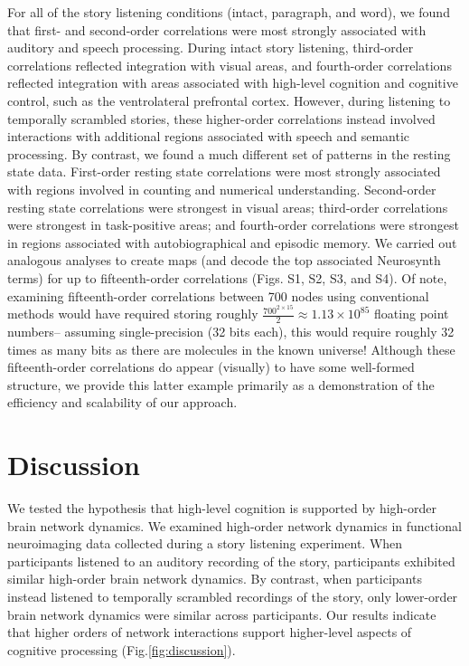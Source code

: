 \documentclass[english]{article}
\begin{document}
For all of the story listening conditions (intact, paragraph, and
word), we found that first- and second-order correlations were most
strongly associated with auditory and speech processing.  During
intact story listening, third-order correlations reflected integration
with visual areas, and fourth-order correlations reflected integration
with areas associated with high-level cognition and cognitive control,
such as the ventrolateral prefrontal cortex.  However, during
listening to temporally scrambled stories, these higher-order
correlations instead involved interactions with additional regions
associated with speech and semantic processing.  By contrast, we found
a much different set of patterns in the resting state data.
First-order resting state correlations were most strongly associated
with regions involved in counting and numerical understanding.
Second-order resting state correlations were strongest in visual
areas; third-order correlations were strongest in task-positive areas;
and fourth-order correlations were strongest in regions associated
with autobiographical and episodic memory.  We carried out analogous
analyses to create maps (and decode the top associated Neurosynth
terms) for up to fifteenth-order correlations (Figs. S1, S2, S3, and
S4).  Of note, examining fifteenth-order correlations between 700
nodes using conventional methods would have required storing roughly
$\frac{700^{2 \times 15}}{2} \approx 1.13 \times 10^{85}$ floating point
numbers-- assuming single-precision (32 bits each), this would require
roughly 32 times as many bits as there are molecules in the known
universe!  Although these fifteenth-order correlations do appear
(visually) to have some well-formed structure, we provide this latter
example primarily as a demonstration of the efficiency and scalability
of our approach.






\section*{Discussion}
We tested the hypothesis that high-level cognition is supported by
high-order brain network dynamics.  We examined high-order network
dynamics in functional neuroimaging data collected during a story
listening experiment.  When participants listened to an auditory
recording of the story, participants exhibited similar high-order
brain network dynamics.  By contrast, when participants instead
listened to temporally scrambled recordings of the story, only
lower-order brain network dynamics were similar across participants.
Our results indicate that higher orders of network interactions
support higher-level aspects of cognitive processing
(Fig.\ref{fig:discussion}).
\end{document}

